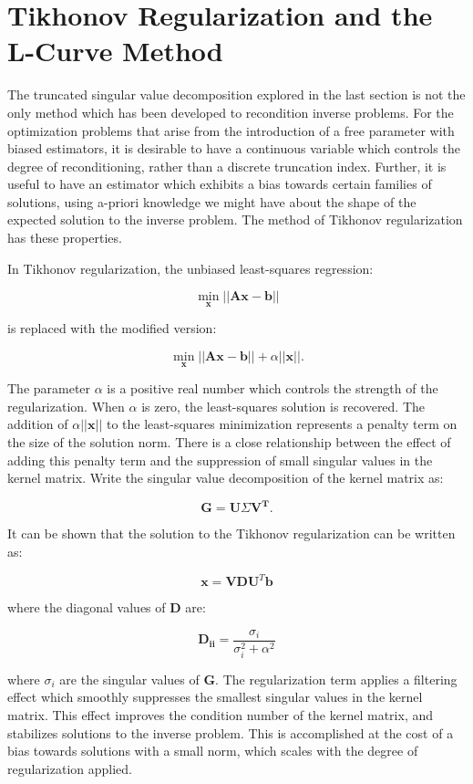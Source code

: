 \section{Tikhonov Regularization and the L-Curve Method}

The truncated singular value decomposition explored in the last section is not the only method which has been developed to recondition inverse problems. For the optimization problems that arise from the introduction of a free parameter with biased estimators, it is desirable to have a continuous variable which controls the degree of reconditioning, rather than a discrete truncation index. Further, it is useful to have an estimator which exhibits a bias towards certain families of solutions, using a-priori knowledge we might have about the shape of the expected solution to the inverse problem. The method of Tikhonov regularization has these properties.

In Tikhonov regularization, the unbiased least-squares regression:

$$\min_{\mathbf{x}} \vert \vert \mathbf{A} \mathbf{x} - \mathbf{b} \vert \vert $$

is replaced with the modified version:

$$\min_{\mathbf{x}} \vert \vert \mathbf{A} \mathbf{x} - \mathbf{b} \vert \vert + \alpha \vert \vert \mathbf{x} \vert \vert.$$

The parameter $\alpha$ is a positive real number which controls the strength of the regularization. When $\alpha$ is zero, the least-squares solution is recovered. The addition of $\alpha \vert \vert \mathbf{x} \vert \vert$ to the least-squares minimization represents a penalty term on the size of the solution norm. There is a close relationship between the effect of adding this penalty term and the suppression of small singular values in the kernel matrix. Write the singular value decomposition of the kernel matrix as:

$$\mathbf{G} = \mathbf{U}\Sigma\mathbf{V^T}.$$

It can be shown that the solution to the Tikhonov regularization can be written as:

$$\mathbf{x} = \mathbf{V}\mathbf{D}\mathbf{U}^T \mathbf{b} $$

where the diagonal values of $\mathbf{D}$ are:

$$\mathbf{D_{ii}} = \frac{\sigma_i}{\sigma_i^2 + \alpha^2}$$

where $\sigma_i$ are the singular values of $\mathbf{G}$. The regularization term applies a filtering effect which smoothly suppresses the smallest singular values in the kernel matrix. This effect improves the condition number of the kernel matrix, and stabilizes solutions to the inverse problem. This is accomplished at the cost of a bias towards solutions with a small norm, which scales with the degree of regularization applied. 

